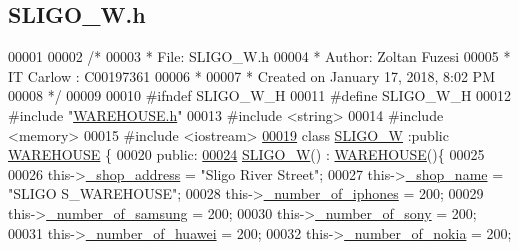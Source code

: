 \hypertarget{_s_l_i_g_o___w_8h_source}{}\subsection{S\+L\+I\+G\+O\+\_\+\+W.\+h}

\begin{DoxyCode}
00001 
00002 \textcolor{comment}{/* }
00003 \textcolor{comment}{ * File:   SLIGO\_W.h}
00004 \textcolor{comment}{ * Author: Zoltan Fuzesi}
00005 \textcolor{comment}{ * IT Carlow : C00197361}
00006 \textcolor{comment}{ *}
00007 \textcolor{comment}{ * Created on January 17, 2018, 8:02 PM}
00008 \textcolor{comment}{ */}
00009 
00010 \textcolor{preprocessor}{#ifndef SLIGO\_W\_H}
00011 \textcolor{preprocessor}{#define SLIGO\_W\_H}
00012 \textcolor{preprocessor}{#include "\hyperlink{_w_a_r_e_h_o_u_s_e_8h}{WAREHOUSE.h}"}
00013 \textcolor{preprocessor}{#include <string>}
00014 \textcolor{preprocessor}{#include <memory>}
00015 \textcolor{preprocessor}{#include <iostream>}
\hypertarget{_s_l_i_g_o___w_8h_source.tex_l00019}{}\hyperlink{class_s_l_i_g_o___w}{00019} \textcolor{keyword}{class }\hyperlink{class_s_l_i_g_o___w}{SLIGO\_W} :\textcolor{keyword}{public} \hyperlink{class_w_a_r_e_h_o_u_s_e}{WAREHOUSE} \{
00020 \textcolor{keyword}{public}:
\hypertarget{_s_l_i_g_o___w_8h_source.tex_l00024}{}\hyperlink{class_s_l_i_g_o___w_a9b669809dc7cf8d9982181ac7997b0da_a9b669809dc7cf8d9982181ac7997b0da}{00024}     \hyperlink{class_s_l_i_g_o___w_a9b669809dc7cf8d9982181ac7997b0da_a9b669809dc7cf8d9982181ac7997b0da}{SLIGO\_W}() : \hyperlink{class_w_a_r_e_h_o_u_s_e}{WAREHOUSE}()\{
00025         
00026         this->\hyperlink{class_s_l_i_g_o___w_ade08b79101c67997dde54515f2088b9d_ade08b79101c67997dde54515f2088b9d}{\_shop\_address} = \textcolor{stringliteral}{"Sligo River Street"};
00027         this->\hyperlink{class_s_l_i_g_o___w_a01bebef43ff4b4d9d728489f05b94d86_a01bebef43ff4b4d9d728489f05b94d86}{\_shop\_name} = \textcolor{stringliteral}{"SLIGO S\_WAREHOUSE"};
00028         this->\hyperlink{class_s_l_i_g_o___w_aa958eed564796bb349d15bf2b2e3208d_aa958eed564796bb349d15bf2b2e3208d}{\_number\_of\_iphones} = 200;
00029         this->\hyperlink{class_s_l_i_g_o___w_a2c7845560ec14452132d659eb54f2cec_a2c7845560ec14452132d659eb54f2cec}{\_number\_of\_samsung} = 200;
00030         this->\hyperlink{class_s_l_i_g_o___w_a0ccf87fe78352e1eac98ed3c85810caa_a0ccf87fe78352e1eac98ed3c85810caa}{\_number\_of\_sony} = 200;
00031         this->\hyperlink{class_s_l_i_g_o___w_af9ca2fb509b7b8ca9f1860ece827501f_af9ca2fb509b7b8ca9f1860ece827501f}{\_number\_of\_huawei} = 200;
00032         this->\hyperlink{class_s_l_i_g_o___w_a9fe78b9365c145432d58cb947b01111a_a9fe78b9365c145432d58cb947b01111a}{\_number\_of\_nokia} = 200;

\end{DoxyCode}
